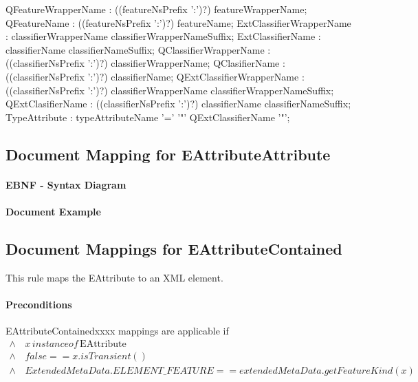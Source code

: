 \documentclass[11pt,a4paper]{article}
\begin{document}
\begin{rail}
QFeatureWrapperName : ((featureNsPrefix ':')?) featureWrapperName;
QFeatureName : ((featureNsPrefix ':')?) featureName;
ExtClassifierWrapperName : classifierWrapperName classifierWrapperNameSuffix;
ExtClassifierName : classifierName classifierNameSuffix;
QClassifierWrapperName : ((classifierNsPrefix ':')?) classifierWrapperName;
QClasifierName : ((classifierNsPrefix ':')?) classifierName;
QExtClassifierWrapperName : ((classifierNsPrefix ':')?) classifierWrapperName classifierWrapperNameSuffix;
QExtClasifierName : ((classifierNsPrefix ':')?) classifierName classifierNameSuffix;
TypeAttribute : typeAttributeName '=' '"' QExtClassifierName '"';

\end{rail}

\subsection{Document Mapping for EAttributeAttribute}

\paragraph{EBNF - Syntax Diagram}

\paragraph{Document Example}

\subsection{Document Mappings for EAttributeContained}
This rule maps the EAttribute to an XML element.



\paragraph{Preconditions} 
EAttributeContainedxxxx mappings are applicable if
\begin{align*}
\wedge & \, x \, instanceof \, \text{EAttribute}  \\
\wedge & \, false == x.isTransient()  \\
\wedge & \,  ExtendedMetaData.ELEMENT\_FEATURE == extendedMetaData.getFeatureKind(x) \\
\end{align*}
\end{document}
